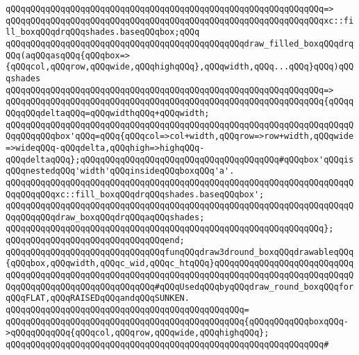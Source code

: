 \verb|qQQqqQQqqQQqqQQqqQQqqQQqqQQqqQQqqQQqqQQqqQQqqQQqqQQqqQQqqQQqqQQq=>|\newline
\verb|qQQqqQQqqQQqqQQqqQQqqQQqqQQqqQQqqQQqqQQqqQQqqQQqqQQqqQQqqQQqqQQqxc::fill_boxqQQqdrqQQqshades.baseqQQqbox;qQQq|\newline
\newline
\verb|qQQqqQQqqQQqqQQqqQQqqQQqqQQqqQQqqQQqqQQqqQQqqQQqdraw_filled_boxqQQqdrqQQq(aqQQqasqQQq{qQQqbox=>{qQQqcol,qQQqrow,qQQqwide,qQQqhighqQQq},qQQqwidth,qQQq...qQQq}qQQq)qQQqshades|\newline
\verb|qQQqqQQqqQQqqQQqqQQqqQQqqQQqqQQqqQQqqQQqqQQqqQQqqQQqqQQqqQQqqQQq=>|\newline
\verb|qQQqqQQqqQQqqQQqqQQqqQQqqQQqqQQqqQQqqQQqqQQqqQQqqQQqqQQqqQQqqQQq{qQQqqQQqqQQqdeltaqQQq=qQQqwidthqQQq+qQQqwidth;|\newline
\verb|qQQqqQQqqQQqqQQqqQQqqQQqqQQqqQQqqQQqqQQqqQQqqQQqqQQqqQQqqQQqqQQqqQQqqQQqqQQqqQQqbox'qQQq=qQQq{qQQqcol=>col+width,qQQqrow=>row+width,qQQqwide=>wideqQQq-qQQqdelta,qQQqhigh=>highqQQq-qQQqdeltaqQQq};qQQqqQQqqQQqqQQqqQQqqQQqqQQqqQQqqQQqqQQq#qQQqbox'qQQqisqQQqnestedqQQq'width'qQQqinsideqQQqboxqQQq'a'.|\newline
\newline
\verb|qQQqqQQqqQQqqQQqqQQqqQQqqQQqqQQqqQQqqQQqqQQqqQQqqQQqqQQqqQQqqQQqqQQqqQQqqQQqqQQqxc::fill_boxqQQqdrqQQqshades.baseqQQqbox';|\newline
\verb|qQQqqQQqqQQqqQQqqQQqqQQqqQQqqQQqqQQqqQQqqQQqqQQqqQQqqQQqqQQqqQQqqQQqqQQqqQQqqQQqdraw_boxqQQqdrqQQqaqQQqshades;|\newline
\verb|qQQqqQQqqQQqqQQqqQQqqQQqqQQqqQQqqQQqqQQqqQQqqQQqqQQqqQQqqQQqqQQq};|\newline
\verb|qQQqqQQqqQQqqQQqqQQqqQQqqQQqqQQqend;|\newline
\newline
\verb|qQQqqQQqqQQqqQQqqQQqqQQqqQQqqQQqfunqQQqdraw3dround_boxqQQqdrawableqQQq{qQQqbox,qQQqwidth,qQQqc_wid,qQQqc_htqQQq}qQQqqQQqqQQqqQQqqQQqqQQqqQQqqQQqqQQqqQQqqQQqqQQqqQQqqQQqqQQqqQQqqQQqqQQqqQQqqQQqqQQqqQQqqQQqqQQqqQQqqQQqqQQqqQQqqQQqqQQqqQQqqQQq#qQQqUsedqQQqbyqQQqdraw_round_boxqQQqforqQQqFLAT,qQQqRAISEDqQQqandqQQqSUNKEN.|\newline
\verb|qQQqqQQqqQQqqQQqqQQqqQQqqQQqqQQqqQQqqQQqqQQqqQQq=|\newline
\verb|qQQqqQQqqQQqqQQqqQQqqQQqqQQqqQQqqQQqqQQqqQQqqQQq{qQQqqQQqqQQqboxqQQq->qQQqqQQqqQQq{qQQqcol,qQQqrow,qQQqwide,qQQqhighqQQq};|\newline
\verb|qQQqqQQqqQQqqQQqqQQqqQQqqQQqqQQqqQQqqQQqqQQqqQQqqQQqqQQqqQQqqQQq#|\newline
